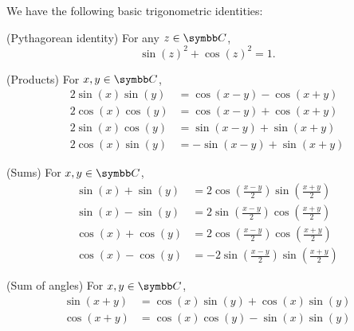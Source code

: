 \begin{proposition}\label{thm:trigonometric_identities}
  We have the following basic trigonometric identities:
  \begin{PropEnum}
     (Pythagorean identity) For any \( z \in \BC \),
    \begin{equation}\label{eq:thm:trigonometric_identities/pythagorean_identity}
      \sin(z)^2 + \cos(z)^2 = 1.
    \end{equation}

     (Products) For \( x, y \in \BC \),
    \begin{align}
      2 \sin(x) \sin(y) & = \cos(x - y) - \cos(x + y) \label{eq:thm:trigonometric_identities/products/ss}  \\
      2 \cos(x) \cos(y) & = \cos(x - y) + \cos(x + y) \label{eq:thm:trigonometric_identities/products/cc}  \\
      2 \sin(x) \cos(y) & = \sin(x - y) + \sin(x + y) \label{eq:thm:trigonometric_identities/products/sc}  \\
      2 \cos(x) \sin(y) & = -\sin(x - y) + \sin(x + y) \label{eq:thm:trigonometric_identities/products/cs}
    \end{align}

     (Sums) For \( x, y \in \BC \),
    \begin{align}
      \sin(x) + \sin(y) & = 2 \cos\left(\frac{x - y} 2 \right) \sin\left(\frac{x + y} 2 \right) \label{eq:thm:trigonometric_identities/sums/sin_sum}   \\
      \sin(x) - \sin(y) & = 2 \sin\left(\frac{x - y} 2 \right) \cos\left(\frac{x + y} 2 \right) \label{eq:thm:trigonometric_identities/sums/sin_diff}  \\
      \cos(x) + \cos(y) & = 2 \cos\left(\frac{x - y} 2 \right) \cos\left(\frac{x + y} 2 \right) \label{eq:thm:trigonometric_identities/sums/cos_sum}   \\
      \cos(x) - \cos(y) & = -2 \sin\left(\frac{x - y} 2 \right) \sin\left(\frac{x + y} 2 \right) \label{eq:thm:trigonometric_identities/sums/cos_diff}
    \end{align}

     (Sum of angles) For \( x, y \in \BC \),
    \begin{align}
      \sin(x + y) & = \cos(x) \sin(y) + \cos(x) \sin(y) \label{eq:thm:trigonometric_identities/sum_of_angles/sin} \\
      \cos(x + y) & = \cos(x) \cos(y) - \sin(x) \sin(y) \label{eq:thm:trigonometric_identities/sum_of_angles/cos}
    \end{align}
  \end{PropEnum}
\end{proposition}
